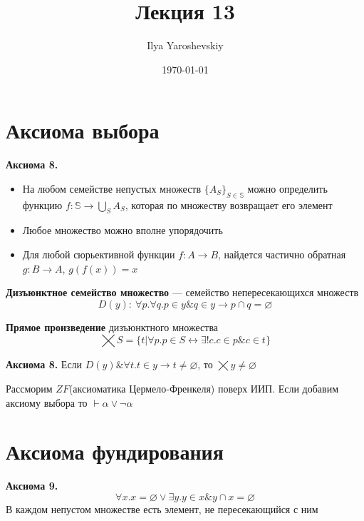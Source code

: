 \documentclass[english]{article}
\author{Ilya Yaroshevskiy}
\date{\today}
\title{Лекция 13}
\begin{document}
\maketitle
\tableofcontents


\section{Аксиома выбора}
\label{sec:orga534af2}
\begin{axiom*}{\bf Аксиома 8.}
	\begin{itemize}
		\item На любом семействе непустых множеств \(\{A_S\}_{S \in \mathbb{S}}\) можно определить функцию \(f: \mathbb{S} \to \bigcup_{S}A_S\), которая по множеству возвращает его элемент
		\item Любое множество можно вполне упорядочить
		\item Для любой сюрьективной функции \(f: A \to B\), найдется частично обратная \(g: B \to A\), \(g(f(x)) = x\)
	\end{itemize}
\end{axiom*}
\begin{definition}
	\textbf{Дизъюнктное семейство множество} --- семейство непересекающихся множеств
	\[ D(y):\ \forall p.\forall q. p \in y \& q \in y \to p \cap q = \varnothing \]
\end{definition}
\begin{definition}
	\textbf{Прямое произведение} дизъюнктного множества
	\[ \bigtimes S = \{t \big| \forall p. p \in S \leftrightarrow \exists ! c. c \in p \& c \in t\} \]
\end{definition}
\begin{axiom*}{\bf Аксиома 8.}
	Если \(D(y)\& \forall t. t \in y \to t \neq \varnothing\), то \(\bigtimes y \neq \varnothing\)
	\label{orgf16798c}
\end{axiom*}
\begin{theorem}[Диаконеску]
	Рассморим \(ZF\)(аксиоматика Цермело-Френкеля) поверх ИИП. Если добавим аксиому выбора то \(\vdash \alpha \lor \lnot \alpha\)
	\label{org48256dc}
\end{theorem}
\section{Аксиома фундирования}
\label{sec:org42f0eff}
\begin{axiom*}{\bf Аксиома 9.}
	\[ \forall x. x = \varnothing \lor \exists y. y \in x \& y \cap x = \varnothing \]
	В каждом непустом множестве есть элемент, не пересекающийся с ним
\end{axiom*}
\end{document}
